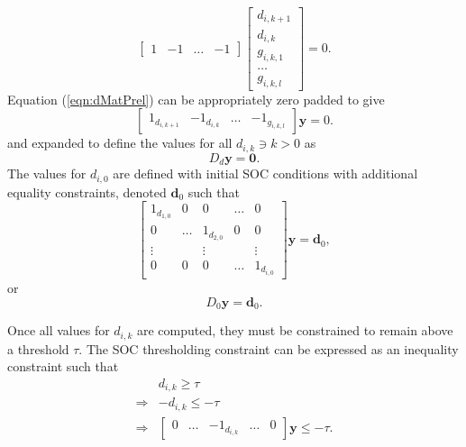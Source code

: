 \begin{equation}\label{eqn:dMatPrel}
	\begin{bmatrix}
		1 & -1 & \hdots & -1
	\end{bmatrix}
	\begin{bmatrix}
		d_{i,k+1} \\ d_{i,k} \\ g_{i,k,1} \\ \hdots \\ g_{i,k,l}
	\end{bmatrix} = 0.
\end{equation}
Equation (\ref{eqn:dMatPrel}) can be appropriately zero padded to give
\begin{equation}
	\begin{bmatrix}
		1_{d_{i,k+1}} & -1_{d_{i,k}} & \hdots & -1_{g_{i,k,l}}
	\end{bmatrix}
	\mathbf{y} = 0.  
\end{equation}
and expanded to define the values for all $d_{i,k} \ni k > 0$ as
\begin{equation}
	D_d\mathbf{y} = \mathbf{0}.
\end{equation}
The values for $d_{i,0}$ are defined with initial SOC conditions with additional equality constraints, denoted $\mathbf{d}_0$ such that
\begin{equation}
	\begin{bmatrix}
		1_{d_{1,0}}& 0 & 0 & \hdots & 0 \\
		0 & \hdots & 1_{d_{2,0}} & 0 & 0 \\
		\vdots  &        &    \vdots   &   & \vdots  \\
		0 & 0      & 0           & \hdots & 1_{d_{i,0}}
	\end{bmatrix}
	\mathbf{y} = \mathbf{d}_0,
\end{equation}
or 
\begin{equation}\label{eqn:dInitialFinal}
	D_0\mathbf{y} = \mathbf{d}_0.
\end{equation}
\par Once all values for $d_{i,k}$ are computed, they must be constrained to remain above a threshold $\tau$. The SOC thresholding constraint can be expressed as an inequality constraint such that
\begin{equation}\label{eqn:tau}
	\begin{aligned}
		& d_{i,k} \ge \tau \\
		\Rightarrow & -d_{i,k} \le -\tau \\
		\Rightarrow & \begin{bmatrix}0 & \hdots & -1_{d_{i,k}}& \hdots & 0 \end{bmatrix}\mathbf{y} \le -\tau.
	\end{aligned}
\end{equation}
